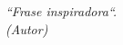 \begin{epigrafe}
  \vspace*{\fill}
  \begin{flushright}
    \textit{``Frase inspiradora``.\\
    (Autor)}
  \end{flushright}
\end{epigrafe}
